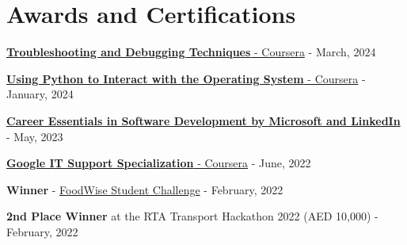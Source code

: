\documentclass[a4paper,20pt]{article}
\begin{document}
\section{Awards and Certifications}
\begin{description}[font=$\bullet$]
	\item {\href{https://coursera.org/verify/QKYV5VQSSVMD}{\textbf{Troubleshooting and Debugging Techniques} - Coursera} - March, 2024}
	\vspace{-5pt}
	\item {\href{https://coursera.org/verify/GV5ZH7QBJP83}{\textbf{Using Python to Interact with the Operating System} - Coursera} - January, 2024}
	\vspace{-5pt}
	\item {\href{https://www.linkedin.com/learning/certificates/89ecc674e4f0587a88390cc07ce509093d8b63cd8bcb02e3fd833e966bba7ea8}{\textbf{Career Essentials in Software Development by Microsoft and LinkedIn}} - May, 2023}
	\vspace{-5pt}
	\item {\href{https://coursera.org/verify/professional-cert/KXSX89ULVN5F}{\textbf{Google IT Support Specialization} - Coursera} - June, 2022}
	\vspace{-5pt}
	\item {\textbf{Winner} - \href{https://www.foodforfuturesummit.com/foodwise}{FoodWise Student Challenge} - February, 2022}
	\vspace{-5pt}
	\item {\textbf{2nd Place Winner} at the RTA Transport Hackathon 2022 (AED 10,000) - February, 2022}
	\vspace{-5pt}

\end{description}
\end{document}
